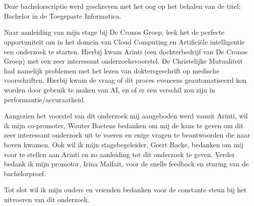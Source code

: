 
\chapter*{}
\label{ch:voorwoord}

Deze bachelorscriptie werd geschreven met het oog op het behalen van de titel: Bachelor in de Toegepaste Informatica. 


Naar aanleiding van mijn stage bij De Cronos Groep, leek het de perfecte opportuniteit om in het domein van Cloud Computing en Artificiële intelligentie een onderzoek te starten. Hierbij kwam Arinti (een dochterbedrijf van De Cronos Groep) met een zeer interessant onderzoeksvoorstel.  De Christelijke Mutualiteit had namelijk problemen met het lezen van doktersgeschrift op medische voorschriften. Hierbij kwam de vraag of dit proces eveneens geautomatiseerd kon worden door gebruik te maken van AI, en of er een verschil zou zijn in performantie/accuraatheid.  


Aangezien het voorstel van dit onderzoek mij aangeboden werd vanuit Arinti, wil ik mijn co-promoter, Wouter Baetens bedanken om mij de kans te geven om dit zeer interessant onderzoek uit te voeren en enige vragen te beantwoorden die naar boven kwamen. Ook wil ik mijn stagebegeleider, Geert Baeke, bedanken om mij voor te stellen aan Arinti en zo aanleiding tot dit onderzoek te geven. Verder bedank ik mijn promotor, Irina Malfait, voor de snelle feedback en sturing van de bachelorproef. 

Tot slot wil ik mijn ouders en vrienden bedanken voor de constante steun bij het uitvoeren van dit onderzoek. 